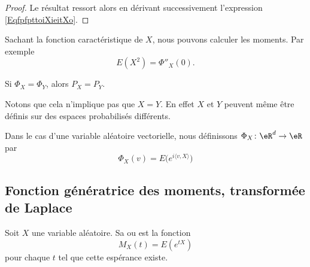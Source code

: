 \begin{proof}
    Le résultat ressort alors en dérivant successivement l'expression \eqref{EqfpfpttoiXieitXo}.
\end{proof}

\begin{example}
    Sachant la fonction caractéristique de \( X\), nous pouvons calculer les moments. Par exemple
    \begin{equation}
        E(X^2)=\Phi''_X(0).
    \end{equation}
\end{example}

\begin{theorem}     \label{ThonMxtTy}
    Si \( \Phi_X=\Phi_Y\), alors \( P_X=P_Y\).
\end{theorem}
Notons que cela n'implique pas que \( X=Y\). En effet \( X\) et \( Y\) peuvent même être définis sur des espaces probabilisés différents.

Dans le cas d'une variable aléatoire vectorielle, nous définissons \( \Phi_X\colon \eR^d\to \eR\) par
\begin{equation}        \label{EqydvDxg}
    \Phi_X(v)=E\big(  e^{i\langle v, X\rangle } \big)
\end{equation}

\subsection{Fonction génératrice des moments, transformée de Laplace}

Soit \( X\) une variable aléatoire. Sa  ou  est la fonction
\begin{equation}
    M_X(t)=E( e^{tX})
\end{equation}
pour chaque \( t\) tel que cette espérance existe.

